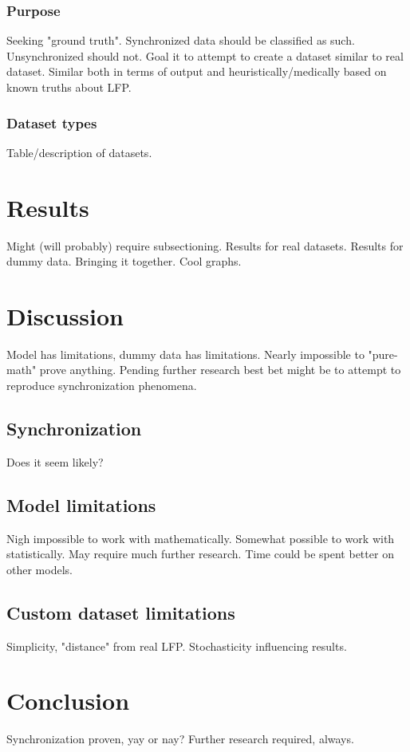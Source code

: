 \documentclass{article}
\begin{document}
\subsubsection{Purpose}
Seeking "ground truth".
Synchronized data should be classified as such.
Unsynchronized should not.
Goal it to attempt to create a dataset similar to real dataset.
Similar both in terms of output and heuristically/medically based on known truths about LFP.

\subsubsection{Dataset types}
Table/description of datasets.

\newpage
\section{Results}
Might (will probably) require subsectioning.
Results for real datasets.
Results for dummy data.
Bringing it together.
Cool graphs.

\newpage
\section{Discussion}
Model has limitations, dummy data has limitations.
Nearly impossible to "pure-math" prove anything.
Pending further research best bet might be to attempt to reproduce synchronization phenomena.

\subsection{Synchronization}
Does it seem likely?

\subsection{Model limitations}
Nigh impossible to work with mathematically.
Somewhat possible to work with statistically.
May require much further research.
Time could be spent better on other models.

\subsection{Custom dataset limitations}
Simplicity, "distance" from real LFP.
Stochasticity influencing results.

\newpage
\section{Conclusion}
Synchronization proven, yay or nay?
Further research required, always.
\end{document}
